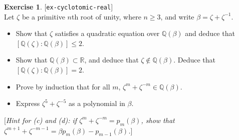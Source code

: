 \documentclass{amsart}
\newcommand{\Q}         {{\mathbb{Q}}}
\newcommand{\R}         {{\mathbb{R}}}
\newcommand{\bt}        {\beta}
\newcommand{\zt}        {\zeta}
\renewcommand{\:}{\colon}
\newcommand{\lastexlabel}{}
\newcommand{\exlabel}[1]{
 \global\def\lastexlabel{#1}\label{#1}[\texttt{#1}]\ \\
}
\newcommand{\exlabel}[1]{
 \global\def\lastexlabel{#1}\label{#1}
}
\theoremstyle{definition}
\newtheorem{exercise}{Exercise}[section]
\begin{document}
\begin{exercise}\exlabel{ex-cyclotomic-real}
 Let $\zt$ be a primitive $n$th root of unity, where $n\geq 3$, and write 
 $\bt=\zt+\zt^{-1}$.
 \begin{itemize}
  \item[(a)] Show that $\zt$ satisfies a quadratic equation over
   $\Q(\bt)$ and deduce that $[\Q(\zt):\Q(\bt)]\leq 2$.
  \item[(b)] Show that $\Q(\bt)\subset\R$, and deduce that
   $\zt\not\in\Q(\bt)$.  Deduce that $[\Q(\zt):\Q(\bt)]=2$.
  \item[(c)] Prove by induction that for all $m$, 
   $\zt^m+\zt^{-m}\in\Q(\bt)$.
  \item[(d)] Express $\zt^5+\zt^{-5}$ as a polynomial in $\bt$.
 \end{itemize}

 [{\sl Hint for (c) and (d): if $\zt^m+\zt^{-m}=p_m(\bt)$, show that
 $\zt^{m+1}+\zt^{-m-1}=\bt p_m(\bt)-p_{m-1}(\bt)$.}]
\end{exercise}
\end{document}
